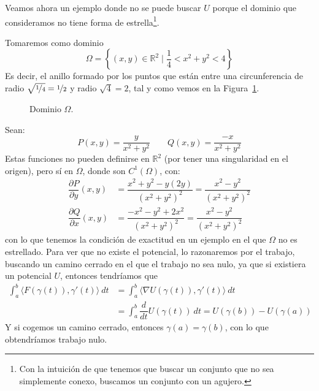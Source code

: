 Veamos ahora un ejemplo donde no se puede buscar $U$ porque el dominio que consideramos no tiene forma de estrella\footnote{Con la intuición de que tenemos que buscar un conjunto que no sea simplemente conexo, buscamos un conjunto con un agujero.}.
\begin{ejemplo}
    Tomaremos como dominio
    \begin{equation*}
        \Omega = \left\{(x,y)\in \mathbb{R}^2 \mid \dfrac{1}{4}<x^2+y^2 < 4\right\}
    \end{equation*}
    Es decir, el anillo formado por los puntos que están entre una circunferencia de radio $\sqrt{\nicefrac{1}{4}}=\nicefrac{1}{2}$ y radio $\sqrt{4}=2$, tal y como vemos en la Figura~\ref{fig:anillo_ejm}.

    \begin{figure}[H]
    \centering
    \caption{Dominio $\Omega$.}
    \label{fig:anillo_ejm}
    \end{figure}
    Sean:
    \begin{equation*}
        P(x,y) = \dfrac{y}{x^2+y^2} \qquad Q(x,y) = \dfrac{-x}{x^2+y^2}
    \end{equation*}
    Estas funciones no pueden definirse en $\mathbb{R}^2$ (por tener una singularidad en el origen), pero sí en $\Omega$, donde son $C^1(\Omega)$, con:
    \begin{align*}
        \dfrac{\partial P}{\partial y}(x,y) &= \dfrac{x^2+y^2 - y(2y)}{{(x^2+y^2)}^{2}} = \dfrac{x^2-y^2}{{(x^2+y^2)}^{2}} \\
        \dfrac{\partial Q}{\partial x}(x,y) &= \dfrac{-x^2-y^2+2x^2}{{(x^2+y^2)}^{2}} = \dfrac{x^2-y^2}{{(x^2+y^2)}^{2}}
    \end{align*}
    con lo que tenemos la condición de exactitud en un ejemplo en el que $\Omega$ no es estrellado. Para ver que no existe el potencial, lo razonaremos por el trabajo, buscando un camino cerrado en el que el trabajo no sea nulo, ya que si existiera un potencial $U$, entonces tendríamos que
    \begin{align*}
        \int_{a}^{b} \langle F(\gamma(t)),\gamma'(t) \rangle~dt  &= \int_{a}^{b} \langle \nabla U(\gamma(t)), \gamma'(t) \rangle~dt   \\
                                                                 &= \int_{a}^{b} \dfrac{d}{dt}U(\gamma(t))~dt  = U(\gamma(b)) - U(\gamma(a))
    \end{align*}
    Y si cogemos un camino cerrado, entonces $\gamma(a)=\gamma(b)$, con lo que obtendríamos trabajo nulo.


\end{ejemplo}
